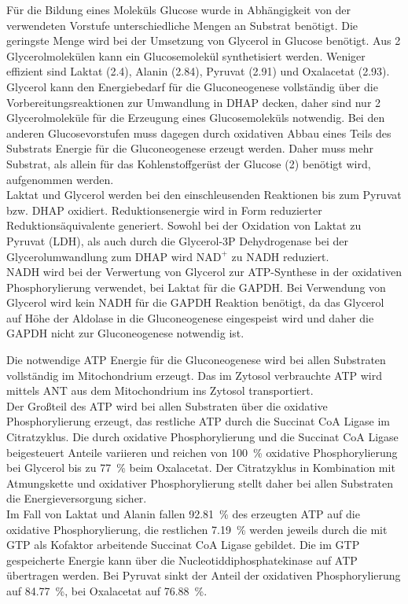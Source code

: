 Für die Bildung eines Moleküls Glucose wurde in Abhängigkeit von der verwendeten Vorstufe unterschiedliche Mengen an Substrat benötigt. Die geringste Menge wird bei der Umsetzung von Glycerol in Glucose benötigt. Aus 2 Glycerolmolekülen kann ein Glucosemolekül synthetisiert werden. Weniger effizient sind Laktat (2.4), Alanin (2.84), Pyruvat (2.91) und Oxalacetat (2.93).\\
Glycerol kann den Energiebedarf für die Gluconeogenese vollständig über die Vorbereitungsreaktionen zur Umwandlung in DHAP decken, daher sind nur 2 Glycerolmoleküle für die Erzeugung eines Glucosemoleküls notwendig. Bei den anderen Glucosevorstufen muss dagegen durch oxidativen Abbau eines Teils des Substrats Energie für die Gluconeogenese erzeugt werden. Daher muss mehr Substrat, als allein für das Kohlenstoffgerüst der Glucose (2) benötigt wird, aufgenommen werden.\\
Laktat und Glycerol werden bei den einschleusenden Reaktionen bis zum Pyruvat bzw. DHAP oxidiert. Reduktionsenergie wird in Form reduzierter Reduktionsäquivalente generiert. Sowohl bei der Oxidation von Laktat zu Pyruvat (LDH), als auch durch die Glycerol-3P Dehydrogenase bei der Glycerolumwandlung zum DHAP wird $\text{NAD}^+$ zu NADH reduziert.\\
NADH wird bei der Verwertung von Glycerol zur ATP-Synthese in der oxidativen Phosphorylierung verwendet, bei Laktat für die GAPDH. Bei Verwendung von Glycerol wird kein NADH für die GAPDH Reaktion benötigt, da das Glycerol auf Höhe der Aldolase in die Gluconeogenese eingespeist wird und daher die GAPDH nicht zur Gluconeogenese notwendig ist.

Die notwendige ATP Energie für die Gluconeogenese wird bei allen Substraten vollständig im Mitochondrium erzeugt. Das im Zytosol verbrauchte ATP wird mittels ANT aus dem Mitochondrium ins Zytosol transportiert.\\
Der Großteil des ATP wird bei allen Substraten über die oxidative Phosphorylierung erzeugt, das restliche ATP durch die Succinat CoA Ligase im Citratzyklus. Die durch oxidative Phosphorylierung und die Succinat CoA Ligase beigesteuert Anteile variieren und reichen von 100~\% oxidative Phosphorylierung bei Glycerol bis zu 77~\% beim Oxalacetat. Der Citratzyklus in Kombination mit Atmungskette und oxidativer Phosphorylierung stellt daher bei allen Substraten die Energieversorgung sicher.\\
Im Fall von Laktat und Alanin fallen 92.81~\% des erzeugten ATP auf die oxidative Phosphorylierung, die restlichen 7.19~\% werden jeweils durch die mit GTP als Kofaktor arbeitende Succinat CoA Ligase gebildet. Die im GTP gespeicherte Energie kann über die Nucleotiddiphosphatekinase auf ATP übertragen werden. Bei Pyruvat sinkt der Anteil der oxidativen Phosphorylierung auf 84.77~\%, bei Oxalacetat auf 76.88~\%.

